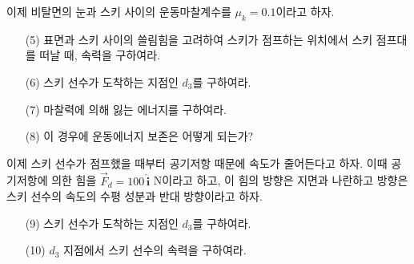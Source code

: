 \documentclass[floatfix,nofootinbib,superscriptaddress,fleqn]{revtex4-2}
\begin{document}
이제 비탈면의 눈과 스키 사이의 운동마찰계수를 $\mu_k=0.1$이라고 하자.
\begin{itemize}
\item[(5)]  표면과 스키 사이의 쓸림힘을 고려하여 스키가 점프하는
  위치에서 스키 점프대를 떠날 때, 속력을 구하여라.
\item[(6)] 스키 선수가 도착하는 지점인 $d_3$를 구하여라.
\item[(7)]  마찰력에 의해 잃는 에너지를 구하여라.
\item[(8)] 이 경우에 운동에너지 보존은 어떻게 되는가? 
\end{itemize}

이제 스키 선수가 점프했을 때부터 공기저항 때문에 속도가 줄어든다고
하자. 이때 공기저항에 의한 힘을 $\vec{F}_d=100\,\hat{\bm{i}}$ N이라고
하고, 이 힘의 방향은 지면과 나란하고 방향은 스키 선수의 속도의 수평
성분과 반대 방향이라고 하자. 
\begin{itemize}
\item[(9)]  스키 선수가 도착하는 지점인 $d_3$를 구하여라.
\item[(10)] $d_3$ 지점에서 스키 선수의 속력을 구하여라.   
\end{itemize}
\end{document}
